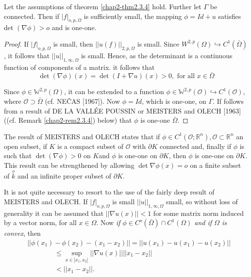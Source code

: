 \begin{theorem}\label{chap2-thm2.3.6}%
  Let the assumptions of theorem \ref{chap2-thm2.3.4} hold. Further
  let $\Gamma $ be 
  connected. Then if $|f|_{o, p,\Omega}$ is sufficiently small, the
  mapping $\phi = Id + u $ satisfies det $( \nabla \phi)>o$ and
  is one-one. 
\end{theorem} 

\begin{proof}
  If $|f|_{o,p,\Omega}$ is small, then $|| u (f) ||_{2,p,\Omega}$ is
  small. Since $W^{2,p}( \Omega ) \hookrightarrow C^1 (
  \bar{\Omega})$, it follows that $|| u ||_{1, \infty, \Omega} $ is
  small. Hence, as the determinant is a continuous function of
  components of a matrix. it follows that  
$$
\det ( \nabla \phi ) (x) = \det ( I + \nabla u )
  (x)>0,\text{ \ for all\ } x \in \bar{\Omega}
$$ 

  Since $\phi \in \mathbb{W}^{2,p}( \Omega) $, it can be extended to a
  function $\phi \in \mathbb{W}^{2,p}(\mathscr{O}) \hookrightarrow C^1
  ( \mathscr{O})$, where $\mathscr{O} \supset \bar{\Omega}$
  (cf. NE\v{C}AS [1967]). Now $ \phi = Id$, which is one-one,
  on $ \Gamma $. If follows from a result of DE LA VALL\'EE POUSSIN or
  MEISTERS and OLECH [1963]((cf. Remark \ref{chap2-rem2.3.4}) below)
  that $\phi$ is one-one $\bar{\Omega}$. 
 \end{proof} 

\begin{remark}\label{chap2-rem2.3.5}%
  The result of MEISTERS and OLECH states that if $\phi \in C^1 (
  \mathscr{O}; \mathbb{R}^n), \mathscr{O}\subset \mathbb{R}^n$ an
  open subset, if $K$ is a compact subset of $\mathscr{O}$ with
  $\partial K$ connected and, finally if $\phi$ is such that $\det (
  \nabla \phi ) > 0$ on $K$\pageoriginale and $\phi$ is one-one on $ \partial
  K$, then $\phi$ is one-one on $\partial K$. This result can be
  strengthened by allowing $\det \nabla \phi (x) = o $ on a
  finite subset of $\overset{o}{k}$ and an infinite proper subset of $
  \partial K$. 
\end{remark} 

\begin{remark}\label{chap2-rem2.3.6}%
  It is not quite necessary to resort to the use of the fairly deep
  result of MEISTERS and OLECH. If $| f |_{o,p, \Omega}$ is small $||
  u ||_{1, \infty, \Omega}$ small, so without loss of generality it
  can be assumed that $|| \nabla u (x) || < 1$ for some matrix
  norm induced by a vector norm, for all $x \in \Omega $. Now {\em if $
  \phi \in C^o ( \bar{\Omega}) \cap C^1 (\Omega ) $  and if $\Omega$ is
   convex}, then 
  \begin{align*}
  & || \phi (x_1) - \phi (x_2) - (x_1 -x_2) || = || u (x_1) -u (x_1) - u(x_2)||\\
    &\qquad\qquad \leq \sup\limits_{x \in ] x_1, x_2[} || \nabla u(x)||
    ||x_1 - x_2||\\ 
    &\qquad\qquad < || x_1 - x_2 ||.
  \end{align*}
\end{remark} 
 

